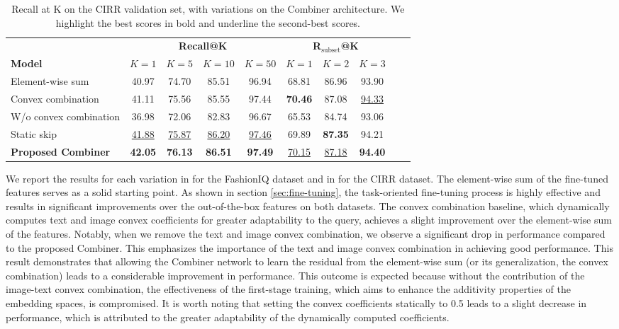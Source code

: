 \documentclass[acmlarge]{acmart}
\begin{document}
\begin{table}[tb]
\centering
\begin{tabular}{lcc  cccc ccc}
  \toprule
& \multicolumn{4}{c}{\textbf{Recall@K}} & \multicolumn{3}{c}{\textbf{R$_\text{subset}$@K}} \\
\cmidrule(lr){2-5}
\cmidrule(lr){6-8}
\textbf{Model}  & $K=1$ & $K=5$ &  $K=10$ & $K=50$ &  $K=1$ & $K=2$ &  $K=3$ \\
\midrule
Element-wise sum  & 40.97 & 74.70 & 85.51 & 96.94 & 68.81 & 86.96 & 93.90 \\
Convex combination & 41.11 & 75.56 & 85.55 & 97.44 & \textbf{70.46} & 87.08 & \underline{94.33}  \\ W/o convex combination & 36.98 & 72.06 & 82.83 & 96.67 & 65.53 & 84.74 & 93.06 \\ Static skip & \underline{41.88} & \underline{75.87} & \underline{86.20} & \underline{97.46} & 69.89 & \textbf{87.35} & 94.21 \\ \textbf{Proposed Combiner} & \textbf{42.05} & \textbf{76.13} & \textbf{86.51} &\textbf{ 97.49} & \underline{70.15} & \underline{87.18} & \textbf{94.40}\\ \bottomrule \end{tabular}
\caption{Recall at K on the CIRR validation set, with variations on the Combiner architecture. We highlight the best scores in bold and underline the second-best scores.}
\label{tab:ablation_cirr_combiner}
\vspace{-4ex}
\end{table} 

We report the results for each variation in  for the FashionIQ dataset and in  for the CIRR dataset.
The element-wise sum of the fine-tuned features serves as a solid starting point. As shown in section \ref{sec:fine-tuning}, the task-oriented fine-tuning process is highly effective and results in significant improvements over the out-of-the-box features on both datasets.
The convex combination baseline, which dynamically computes text and image convex coefficients for greater adaptability to the query, achieves a slight improvement over the element-wise sum of the features.
Notably, when we remove the text and image convex combination, we observe a significant drop in performance compared to the proposed Combiner. This emphasizes the importance of the text and image convex combination in achieving good performance.
This result demonstrates that allowing the Combiner network to learn the residual from the element-wise sum (or its generalization, the convex combination) leads to a considerable improvement in performance. This outcome is expected because without the contribution of the image-text convex combination, the effectiveness of the first-stage training, which aims to enhance the additivity properties of the embedding spaces, is compromised.
It is worth noting that setting the convex coefficients statically to 0.5 leads to a slight decrease in performance, which is attributed to the greater adaptability of the dynamically computed coefficients.
\end{document}
